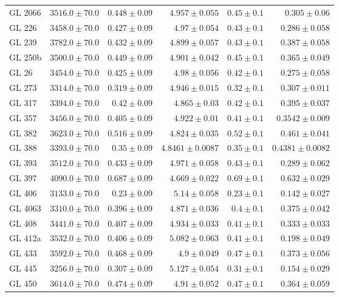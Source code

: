 \begin{longtable*}{lrrrrr}
GL 2066 & $3516.0\pm 70.0$ & $0.448\pm 0.09$ & $4.957\pm 0.055$ & $0.45\pm 0.1$ & $0.305\pm 0.06$ \\ 
GL 226 & $3458.0\pm 70.0$ & $0.427\pm 0.09$ & $4.97\pm 0.054$ & $0.43\pm 0.1$ & $0.286\pm 0.058$ \\ 
GL 239 & $3782.0\pm 70.0$ & $0.432\pm 0.09$ & $4.899\pm 0.057$ & $0.43\pm 0.1$ & $0.387\pm 0.058$ \\ 
GL 250b & $3500.0\pm 70.0$ & $0.449\pm 0.09$ & $4.901\pm 0.042$ & $0.45\pm 0.1$ & $0.365\pm 0.049$ \\ 
GL 26 & $3454.0\pm 70.0$ & $0.425\pm 0.09$ & $4.98\pm 0.056$ & $0.42\pm 0.1$ & $0.275\pm 0.058$ \\ 
GL 273 & $3314.0\pm 70.0$ & $0.319\pm 0.09$ & $4.946\pm 0.015$ & $0.32\pm 0.1$ & $0.307\pm 0.011$ \\ 
GL 317 & $3394.0\pm 70.0$ & $0.42\pm 0.09$ & $4.865\pm 0.03$ & $0.42\pm 0.1$ & $0.395\pm 0.037$ \\ 
GL 357 & $3456.0\pm 70.0$ & $0.405\pm 0.09$ & $4.922\pm 0.01$ & $0.41\pm 0.1$ & $0.3542\pm 0.009$ \\ 
GL 382 & $3623.0\pm 70.0$ & $0.516\pm 0.09$ & $4.824\pm 0.035$ & $0.52\pm 0.1$ & $0.461\pm 0.041$ \\ 
GL 388 & $3393.0\pm 70.0$ & $0.35\pm 0.09$ & $4.8461\pm 0.0087$ & $0.35\pm 0.1$ & $0.4381\pm 0.0082$ \\ 
GL 393 & $3512.0\pm 70.0$ & $0.433\pm 0.09$ & $4.971\pm 0.058$ & $0.43\pm 0.1$ & $0.289\pm 0.062$ \\ 
GL 397 & $4090.0\pm 70.0$ & $0.687\pm 0.09$ & $4.669\pm 0.022$ & $0.69\pm 0.1$ & $0.632\pm 0.029$ \\ 
GL 406 & $3133.0\pm 70.0$ & $0.23\pm 0.09$ & $5.14\pm 0.058$ & $0.23\pm 0.1$ & $0.142\pm 0.027$ \\ 
GL 4063 & $3310.0\pm 70.0$ & $0.396\pm 0.09$ & $4.871\pm 0.036$ & $0.4\pm 0.1$ & $0.375\pm 0.042$ \\ 
GL 408 & $3441.0\pm 70.0$ & $0.407\pm 0.09$ & $4.934\pm 0.033$ & $0.41\pm 0.1$ & $0.333\pm 0.033$ \\ 
GL 412a & $3532.0\pm 70.0$ & $0.406\pm 0.09$ & $5.082\pm 0.063$ & $0.41\pm 0.1$ & $0.198\pm 0.049$ \\ 
GL 433 & $3592.0\pm 70.0$ & $0.468\pm 0.09$ & $4.9\pm 0.049$ & $0.47\pm 0.1$ & $0.373\pm 0.056$ \\ 
GL 445 & $3256.0\pm 70.0$ & $0.307\pm 0.09$ & $5.127\pm 0.054$ & $0.31\pm 0.1$ & $0.154\pm 0.029$ \\ 
GL 450 & $3614.0\pm 70.0$ & $0.474\pm 0.09$ & $4.91\pm 0.052$ & $0.47\pm 0.1$ & $0.364\pm 0.059$ \\ 

\end{longtable*}
